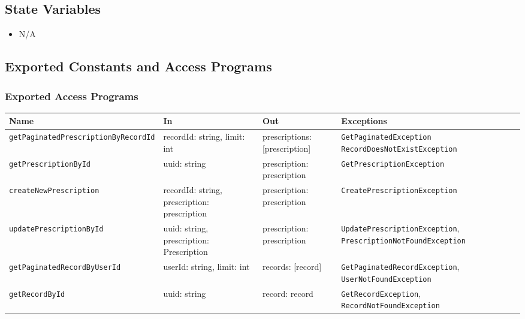 \documentclass[12pt, titlepage]{article}
\begin{document}
\subsection{State Variables}
\begin{itemize}
\item N/A
\end{itemize}

\subsection{Exported Constants and Access Programs}
\subsubsection{Exported Access Programs}
\begin{center}
\small  %
\renewcommand{\arraystretch}{1.5}  %
\begin{tabular}{|l|p{2.15cm}|p{2.25cm}|p{5.75cm}|}
    \hline
    \textbf{Name} & \textbf{In} & \textbf{Out} & \textbf{Exceptions} \\
    \hline 
    \texttt{getPaginatedPrescriptionByRecordId} & recordId: string, \newline limit: int & prescriptions: [prescription] & \texttt{GetPaginatedException} \newline \texttt{RecordDoesNotExistException}\\
    \hline
    \texttt{getPrescriptionById} & uuid: string & prescription: prescription & \texttt{GetPrescriptionException} \\
    \hline
    \texttt{createNewPrescription} & recordId: string, \newline prescription: prescription & prescription: prescription & \texttt{CreatePrescriptionException} \\
    \hline
    \texttt{updatePrescriptionById} & uuid: string, \newline prescription: Prescription & prescription: prescription & \texttt{UpdatePrescriptionException}, \newline \texttt{PrescriptionNotFoundException} \\
    \hline
    \texttt{getPaginatedRecordByUserId} & userId: string, \newline limit: int & records: [record] & \texttt{GetPaginatedRecordException}, \newline \texttt{UserNotFoundException} \\
    \hline
    \texttt{getRecordById} & uuid: string & record: record & \texttt{GetRecordException}, \newline \texttt{RecordNotFoundException} \\

\end{tabular}
\end{center}
\end{document}
